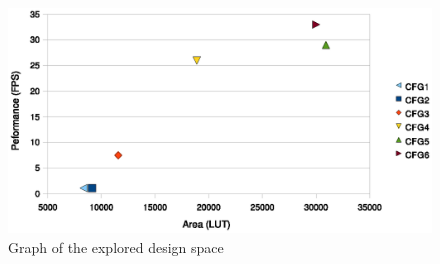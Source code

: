 \begin{figure}[h]
\centering
\includegraphics{figs/designspace.eps}
\caption{Graph of the explored design space}
\label{fig:designspace}
\end{figure}

